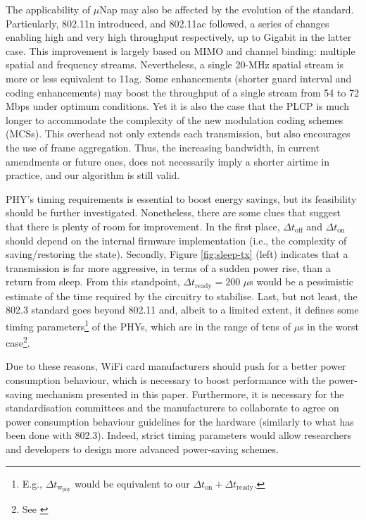 \documentclass[twoside,nohyper]{tufte-book}
\theoremstyle{definition}
\theoremstyle{definition}
\theoremstyle{definition}
\theoremstyle{remark}
\begin{document}
The applicability of \(\mu\)Nap may also be affected by the evolution of
the standard. Particularly, 802.11n introduced, and 802.11ac followed, a
series of changes enabling high and very high throughput respectively,
up to Gigabit in the latter case. This improvement is largely based on
MIMO and channel binding: multiple spatial and frequency streams.
Nevertheless, a single 20-MHz spatial stream is more or less equivalent
to 11ag. Some enhancements (shorter guard interval and coding
enhancements) may boost the throughput of a single stream from 54 to 72
Mbps under optimum conditions. Yet it is also the case that the PLCP is
much longer to accommodate the complexity of the new modulation coding
schemes (MCSs). This overhead not only extends each transmission, but
also encourages the use of frame aggregation. Thus, the increasing
bandwidth, in current amendments or future ones, does not necessarily
imply a shorter airtime in practice, and our algorithm is still valid.

 PHY's timing requirements is essential to boost
energy savings, but its feasibility should be further investigated.
Nonetheless, there are some clues that suggest that there is plenty of
room for improvement. In the first place, \(\Delta t_\mathrm{off}\) and
\(\Delta t_\mathrm{on}\) should depend on the internal firmware
implementation (i.e., the complexity of saving/restoring the state).
Secondly, Figure \ref{fig:sleep-tx} (left) indicates that a transmission
is far more aggressive, in terms of a sudden power rise, than a return
from sleep. From this standpoint, \(\Delta t_\mathrm{ready} = 200\)
\(\mu\)s would be a pessimistic estimate of the time required by the
circuitry to stabilise. Last, but not least, the 802.3 standard goes
beyond 802.11 and, albeit to a limited extent, it defines some timing
parameters\footnote{E.g., \(\Delta t_\mathrm{w_{phy}}\) would be
  equivalent to our \(\Delta t_\mathrm{on}+\Delta t_\mathrm{ready}\).}
of the PHYs, which are in the range of tens of \(\mu\)s in the worst
case\footnote{See \citet[Table 78-4]{8023}}.

Due to these reasons, WiFi card manufacturers should push for a better
power consumption behaviour, which is necessary to boost performance
with the power-saving mechanism presented in this paper. Furthermore, it
is necessary for the standardisation committees and the manufacturers to
collaborate to agree on power consumption behaviour guidelines for the
hardware (similarly to what has been done with 802.3). Indeed, strict
timing parameters would allow researchers and developers to design more
advanced power-saving schemes.
\end{document}
